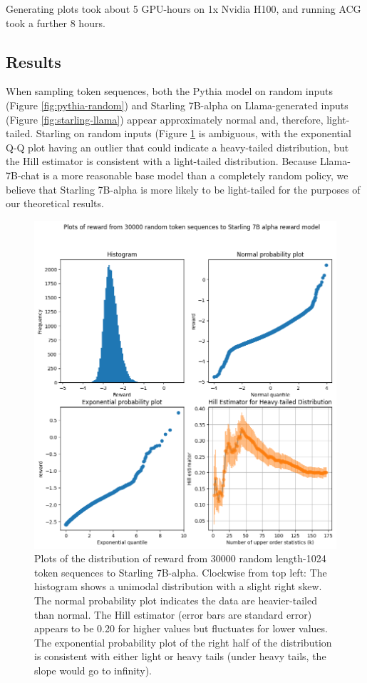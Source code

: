 \documentclass{article}
\begin{document}
Generating plots took about 5 GPU-hours on 1x Nvidia H100, and running ACG took a further 8 hours.

\subsection{Results\label{sec:experiments}}

When sampling token sequences, both the Pythia model on random inputs (Figure \ref{fig:pythia-random}) and Starling 7B-alpha on Llama-generated inputs (Figure \ref{fig:starling-llama}) appear approximately normal and, therefore, light-tailed. Starling on random inputs (Figure \ref{fig:starling-random} is ambiguous, with the exponential Q-Q plot having an outlier that could indicate a heavy-tailed distribution, but the Hill estimator is consistent with a light-tailed distribution. Because Llama-7B-chat is a more reasonable base model than a completely random policy, we believe that Starling 7B-alpha is more likely to be light-tailed for the purposes of our theoretical results.

\begin{figure}
    \centering
    \includegraphics[width=0.8\linewidth]{images/reward_plots_random_starling_30k_se.png}
    \caption{Plots of the distribution of reward from 30000 random length-1024 token sequences to Starling 7B-alpha. Clockwise from top left: The histogram shows a unimodal distribution with a slight right skew. The normal probability plot indicates the data are heavier-tailed than normal. The Hill estimator (error bars are standard error) appears to be 0.20 for higher values but fluctuates for lower values. The exponential probability plot of the right half of the distribution is consistent with either light or heavy tails (under heavy tails, the slope would go to infinity).}
    \label{fig:starling-random}
\end{figure}
\end{document}
